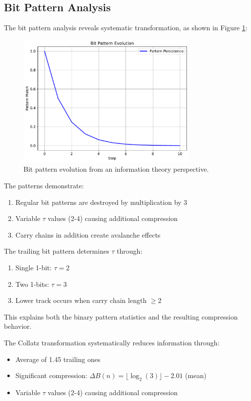 \subsection{Bit Pattern Analysis}

The bit pattern analysis reveals systematic transformation, as shown in Figure \ref{fig:bit_patterns_info}:

\begin{figure}[h]
\centering
\includegraphics[width=0.8\textwidth]{py_visuals/figures/bit_patterns.pdf}
\caption{Bit pattern evolution from an information theory perspective.}
\label{fig:bit_patterns_info}
\end{figure}

The patterns demonstrate:
\begin{enumerate}
\item Regular bit patterns are destroyed by multiplication by 3
\item Variable $\tau$ values (2-4) causing additional compression
\item Carry chains in addition create avalanche effects
\end{enumerate}

The trailing bit pattern determines $\tau$ through:
\begin{enumerate}
\item Single 1-bit: $\tau = 2$
\item Two 1-bits: $\tau = 3$
\item Lower track occurs when carry chain length $\geq 2$
\end{enumerate}

This explains both the binary pattern statistics and the resulting compression behavior.

\begin{theorem}
\label{thm:entropy}
The Collatz transformation systematically reduces information through:
\begin{itemize}
\item Average of 1.45 trailing ones
\item Significant compression: $\Delta B(n) = \lfloor \log_2(3) \rfloor - 2.01$ (mean)
\item Variable $\tau$ values (2-4) causing additional compression
\end{itemize}
\end{theorem}

